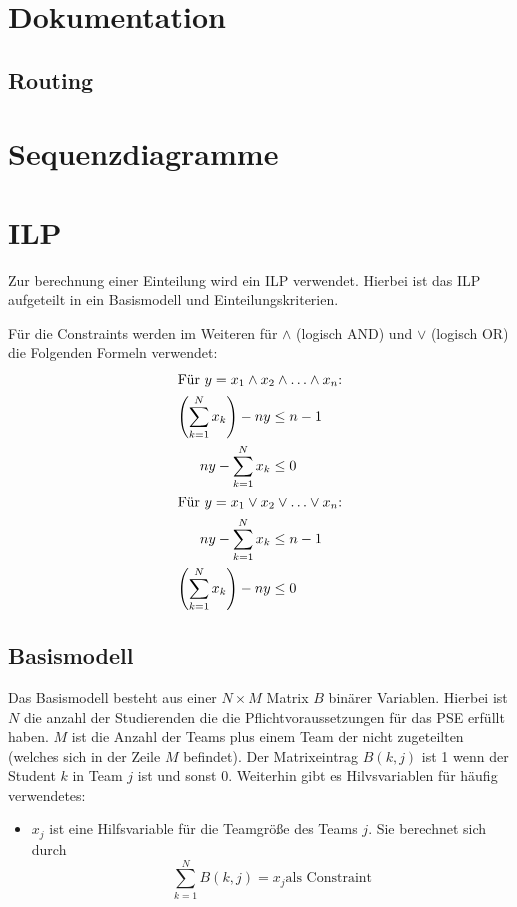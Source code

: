 \documentclass[parskip=full]{scrartcl}
\begin{document}
\section{Dokumentation}







\subsection{Routing}

\section{Sequenzdiagramme}

\section{ILP}
Zur berechnung einer Einteilung wird ein ILP verwendet. Hierbei ist das ILP
aufgeteilt in ein Basismodell und Einteilungskriterien. 

Für die Constraints werden im Weiteren für $\wedge$ (logisch AND) und
$\vee$ (logisch OR) die Folgenden Formeln verwendet:
\begin{align*}
\intertext{Für $y = x_1 \wedge x_2 \wedge \ldots \wedge x_n$:} 
\left(\sum_{k=1}^{N}x_k \right)-ny & \le n-1\\
ny - \sum_{k=1}^{N}x_k & \le 0\\
\intertext{Für  $y = x_1 \vee x_2 \vee \ldots \vee x_n$:}
ny - \sum_{k=1}^{N}x_k & \le n-1\\
\left(\sum_{k=1}^{N}x_k \right) - ny  &\le 0
\end{align*}
\subsection{Basismodell}
Das Basismodell besteht aus einer $N \times M$ Matrix $B$ binärer Variablen.
Hierbei ist $N$ die anzahl der Studierenden die die Pflichtvoraussetzungen für das PSE
erfüllt haben. $M$ ist die Anzahl der Teams plus einem Team
der nicht zugeteilten (welches sich in der Zeile $M$ befindet). Der
Matrixeintrag $B(k,j)$ ist 1 wenn der Student $k$ in Team $j$ ist und sonst 0.
Weiterhin gibt es Hilvsvariablen für häufig verwendetes: 
\begin{itemize}
  \item $x_j$ ist eine Hilfsvariable für die Teamgröße des Teams $j$. Sie berechnet
sich durch
\begin{equation*}
\sum_{k = 1}^{N} B(k,j) = x_j  \text{
als Constraint}
\end{equation*}
\end{itemize}
\end{document}
